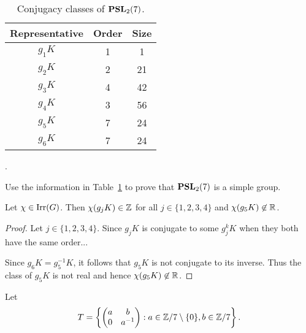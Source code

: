 \begin{table}[ht]
    \caption{Conjugacy classes of $\mathbf{PSL}_2(7)$.}
    \begin{tabular}{|c|c|c|}
        \hline 
        Representative & Order & Size  \\
        \hline 
         $g_1K$ & 1 & 1 \\
         $g_2K$ & 2 & 21 \\
         $g_3K$ & 4 & 42\\
         $g_4K$ & 3 & 56 \\
         $g_5K$ & 7 & 24 \\
         $g_6K$ & 7 & 24 \\
         \hline 
    \end{tabular}
    \label{tab:cc:PSL(2,7)}.
\end{table}

\begin{exercise}
    Use the information in Table~\ref{tab:cc:PSL(2,7)}
    to prove that $\mathbf{PSL}_2(7)$ is a simple group. 
\end{exercise}

\begin{proposition}
    Let $\chi\in\operatorname{Irr}(G)$. Then $\chi(g_jK)\in\mathbb{Z}$ for all 
    $j\in\{1,2,3,4\}$ and $\chi(g_5K)\not\in\mathbb{R}$. 
\end{proposition}

\begin{proof}
    Let $j\in\{1,2,3,4\}$. Since 
    $g_jK$ is conjugate to some $g_j^kK$
    when they both have the same order...   
    
    Since $g_6K=g_5^{-1}K$, it follows
    that $g_5K$ is not conjugate to its inverse. Thus 
    the class of $g_5K$ is not real and hence 
    $\chi(g_5K)\not\in\mathbb{R}$. 
\end{proof}

\begin{proposition}
    Let 
    \[
    T=\left\{\begin{pmatrix}
        a&b\\
        0&a^{-1}
        \end{pmatrix}
        :a\in\mathbb{Z}/7\setminus\{0\},
        b\in\mathbb{Z}/7\right\}.
    \]
    
\end{proposition}